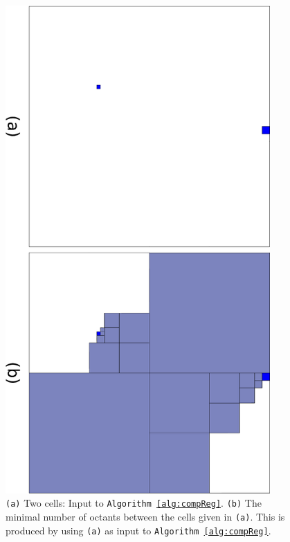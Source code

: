 \begin{figure}
  \begin{center}
    \includegraphics[angle=90,width=0.9\textwidth]{images/compReg}
    \caption{{\tt(a)} Two cells: Input to {\tt Algorithm \ref{alg:compReg}}. {\tt(b)} The minimal number of octants between the cells given in {\tt(a)}. This is produced by using {\tt(a)} as input to {\tt Algorithm \ref{alg:compReg}}.}
    \label{fig:compReg}
  \end{center}
\end{figure}


